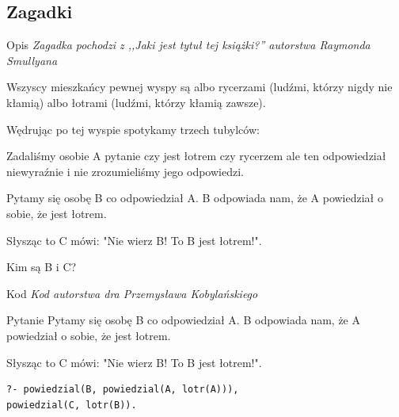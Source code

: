 \documentclass[blue]{beamer}
\begin{document}
\subsection{Zagadki}
\begin{frame}{Opis}
\textit{Zagadka pochodzi z ,,Jaki jest tytuł tej książki?'' autorstwa Raymonda Smullyana}

Wszyscy mieszkańcy pewnej wyspy są albo rycerzami (ludźmi, którzy nigdy nie kłamią) albo łotrami (ludźmi, którzy kłamią zawsze).

Wędrując po tej wyspie spotykamy trzech tubylców:

Zadaliśmy osobie A pytanie czy jest łotrem czy rycerzem ale ten odpowiedział niewyraźnie i nie zrozumieliśmy jego odpowiedzi.

Pytamy się osobę B co odpowiedział A. B odpowiada nam, że A powiedział o sobie, że jest łotrem.

Słysząc to C mówi: "Nie wierz B! To B jest łotrem!".

Kim są B i C?
\end{frame}
\begin{frame}{Kod}
\textit{Kod autorstwa dra Przemysława Kobylańskiego}

\end{frame}
\begin{frame}[fragile]{Pytanie}
Pytamy się osobę B co odpowiedział A. B odpowiada nam, że A powiedział o sobie, że jest łotrem.

Słysząc to C mówi: "Nie wierz B! To B jest łotrem!".
\begin{lstlisting}
?- powiedzial(B, powiedzial(A, lotr(A))),
powiedzial(C, lotr(B)).
\end{lstlisting}
\end{frame}
\end{document}
